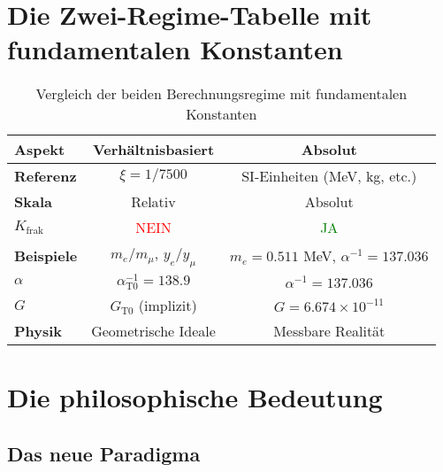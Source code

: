\documentclass[12pt,a4paper]{article}
\begin{document}
	\section{Die Zwei-Regime-Tabelle mit fundamentalen Konstanten}
	
	\begin{table}[h]
		\centering
		\begin{tabular}{lcc}
			\toprule
			\textbf{Aspekt} & \textbf{Verhältnisbasiert} & \textbf{Absolut} \\
			\midrule
			\textbf{Referenz} & $\xi = 1/7500$ & SI-Einheiten (MeV, kg, etc.) \\
			\textbf{Skala} & Relativ & Absolut \\
			\textbf{$K_{\text{frak}}$} & \textcolor{red}{NEIN} & \textcolor{green}{JA} \\
			\textbf{Beispiele} & $m_e/m_μ$, $y_e/y_μ$ & $m_e = 0.511$ MeV, $\alpha^{-1} = 137.036$ \\
			\textbf{$\alpha$} & $\alpha_{\text{T0}}^{-1} = 138.9$ & $\alpha^{-1} = 137.036$ \\
			\textbf{$G$} & $G_{\text{T0}}$ (implizit) & $G = 6.674\times10^{-11}$ \\
			\textbf{Physik} & Geometrische Ideale & Messbare Realität \\
			\bottomrule
		\end{tabular}
		\caption{Vergleich der beiden Berechnungsregime mit fundamentalen Konstanten}
	\end{table}
	
	\section{Die philosophische Bedeutung}
	
	\subsection{Das neue Paradigma}
	
	\begin{center}
	\end{center}
	
\end{document}
